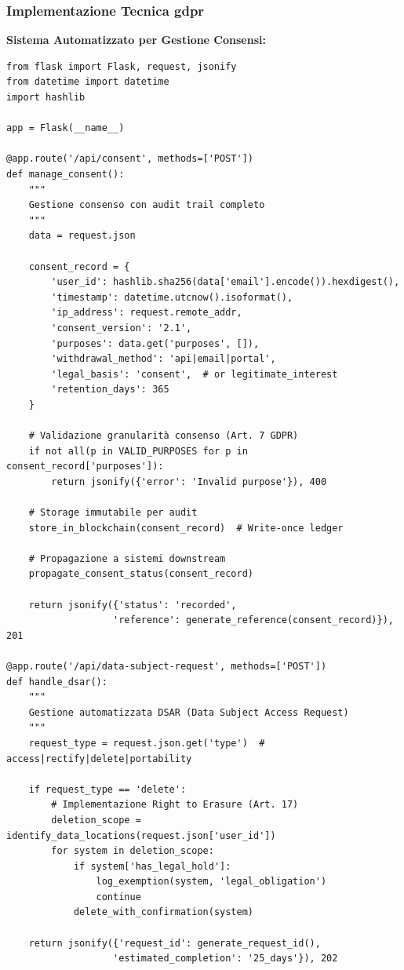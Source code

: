 \subsubsection{Implementazione Tecnica \gls{gdpr}}

\textbf{Sistema Automatizzato per Gestione Consensi:}
\begin{lstlisting}[caption={API REST per Gestione Consensi \gls{gdpr}},label={lst:gdpr_consent}]
from flask import Flask, request, jsonify
from datetime import datetime
import hashlib

app = Flask(__name__)

@app.route('/api/consent', methods=['POST'])
def manage_consent():
    """
    Gestione consenso con audit trail completo
    """
    data = request.json
    
    consent_record = {
        'user_id': hashlib.sha256(data['email'].encode()).hexdigest(),
        'timestamp': datetime.utcnow().isoformat(),
        'ip_address': request.remote_addr,
        'consent_version': '2.1',
        'purposes': data.get('purposes', []),
        'withdrawal_method': 'api|email|portal',
        'legal_basis': 'consent',  # or legitimate_interest
        'retention_days': 365
    }
    
    # Validazione granularità consenso (Art. 7 GDPR)
    if not all(p in VALID_PURPOSES for p in consent_record['purposes']):
        return jsonify({'error': 'Invalid purpose'}), 400
    
    # Storage immutabile per audit
    store_in_blockchain(consent_record)  # Write-once ledger
    
    # Propagazione a sistemi downstream
    propagate_consent_status(consent_record)
    
    return jsonify({'status': 'recorded', 
                   'reference': generate_reference(consent_record)}), 201

@app.route('/api/data-subject-request', methods=['POST'])
def handle_dsar():
    """
    Gestione automatizzata DSAR (Data Subject Access Request)
    """
    request_type = request.json.get('type')  # access|rectify|delete|portability
    
    if request_type == 'delete':
        # Implementazione Right to Erasure (Art. 17)
        deletion_scope = identify_data_locations(request.json['user_id'])
        for system in deletion_scope:
            if system['has_legal_hold']:
                log_exemption(system, 'legal_obligation')
                continue
            delete_with_confirmation(system)
    
    return jsonify({'request_id': generate_request_id(),
                   'estimated_completion': '25_days'}), 202
\end{lstlisting}

